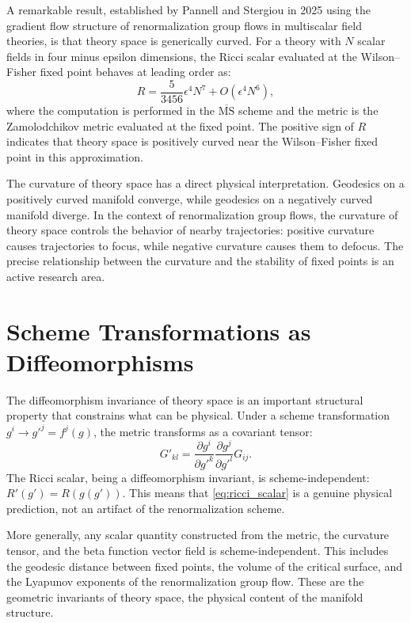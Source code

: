 \documentclass[11pt, twoside, openright]{book}
\theoremstyle{dotted}
\theoremstyle{definition}
\begin{document}
A remarkable result, established by Pannell and Stergiou in 2025 using the
gradient flow structure of renormalization group flows in multiscalar field theories,
is that theory space is generically curved. For a theory with $N$ scalar fields
in four minus epsilon dimensions, the Ricci scalar evaluated at the Wilson--Fisher
fixed point behaves at leading order as:
\begin{equation}
  R = \frac{5}{3456}\epsilon^4 N^7 + O(\epsilon^4 N^6),
  \label{eq:ricci_scalar}
\end{equation}
where the computation is performed in the $\overline{\mathrm{MS}}$ scheme and
the metric is the Zamolodchikov metric evaluated at the fixed point. The positive
sign of $R$ indicates that theory space is positively curved near the Wilson--Fisher
fixed point in this approximation.

The curvature of theory space has a direct physical interpretation. Geodesics on
a positively curved manifold converge, while geodesics on a negatively curved
manifold diverge. In the context of renormalization group flows, the curvature of
theory space controls the behavior of nearby trajectories: positive curvature
causes trajectories to focus, while negative curvature causes them to defocus.
The precise relationship between the curvature and the stability of fixed points
is an active research area.

\section{Scheme Transformations as Diffeomorphisms}

The diffeomorphism invariance of theory space is an important structural property
that constrains what can be physical. Under a scheme transformation $g^i \to g'^j
= f^j(g)$, the metric transforms as a covariant tensor:
\begin{equation}
  G'_{kl} = \frac{\partial g^i}{\partial g'^k}\frac{\partial g^j}{\partial g'^l}G_{ij}.
  \label{eq:metric_transform}
\end{equation}
The Ricci scalar, being a diffeomorphism invariant, is scheme-independent:
$R'(g') = R(g(g'))$. This means that \eqref{eq:ricci_scalar} is a genuine physical
prediction, not an artifact of the renormalization scheme.

More generally, any scalar quantity constructed from the metric, the curvature
tensor, and the beta function vector field is scheme-independent. This includes
the geodesic distance between fixed points, the volume of the critical surface,
and the Lyapunov exponents of the renormalization group flow. These are the
geometric invariants of theory space, the physical content of the manifold structure.
\end{document}
